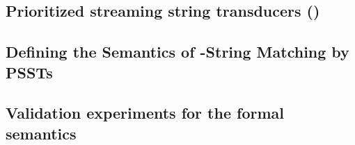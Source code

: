 

\subsection{Prioritized streaming string transducers (\PSST)}





\subsection{Defining the Semantics of \regexp-String Matching by PSSTs} \label{sect:regextopsst}




\subsection{Validation experiments for the formal semantics} \label{sect：valid}

